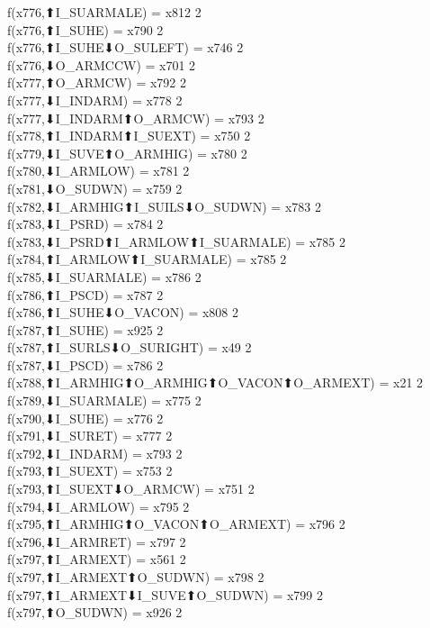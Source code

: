 f(x776,⬆I_SUARMALE) = x812 {2} \\
f(x776,⬆I_SUHE) = x790 {2} \\
f(x776,⬆I_SUHE⬇O_SULEFT) = x746 {2} \\
f(x776,⬇O_ARMCCW) = x701 {2} \\
f(x777,⬆O_ARMCW) = x792 {2} \\
f(x777,⬇I_INDARM) = x778 {2} \\
f(x777,⬇I_INDARM⬆O_ARMCW) = x793 {2} \\
f(x778,⬆I_INDARM⬆I_SUEXT) = x750 {2} \\
f(x779,⬇I_SUVE⬆O_ARMHIG) = x780 {2} \\
f(x780,⬇I_ARMLOW) = x781 {2} \\
f(x781,⬇O_SUDWN) = x759 {2} \\
f(x782,⬇I_ARMHIG⬆I_SUILS⬇O_SUDWN) = x783 {2} \\
f(x783,⬇I_PSRD) = x784 {2} \\
f(x783,⬇I_PSRD⬆I_ARMLOW⬆I_SUARMALE) = x785 {2} \\
f(x784,⬆I_ARMLOW⬆I_SUARMALE) = x785 {2} \\
f(x785,⬇I_SUARMALE) = x786 {2} \\
f(x786,⬆I_PSCD) = x787 {2} \\
f(x786,⬆I_SUHE⬇O_VACON) = x808 {2} \\
f(x787,⬆I_SUHE) = x925 {2} \\
f(x787,⬆I_SURLS⬇O_SURIGHT) = x49 {2} \\
f(x787,⬇I_PSCD) = x786 {2} \\
f(x788,⬆I_ARMHIG⬆O_ARMHIG⬆O_VACON⬆O_ARMEXT) = x21 {2} \\
f(x789,⬇I_SUARMALE) = x775 {2} \\
f(x790,⬇I_SUHE) = x776 {2} \\
f(x791,⬇I_SURET) = x777 {2} \\
f(x792,⬇I_INDARM) = x793 {2} \\
f(x793,⬆I_SUEXT) = x753 {2} \\
f(x793,⬆I_SUEXT⬇O_ARMCW) = x751 {2} \\
f(x794,⬇I_ARMLOW) = x795 {2} \\
f(x795,⬆I_ARMHIG⬆O_VACON⬆O_ARMEXT) = x796 {2} \\
f(x796,⬇I_ARMRET) = x797 {2} \\
f(x797,⬆I_ARMEXT) = x561 {2} \\
f(x797,⬆I_ARMEXT⬆O_SUDWN) = x798 {2} \\
f(x797,⬆I_ARMEXT⬇I_SUVE⬆O_SUDWN) = x799 {2} \\
f(x797,⬆O_SUDWN) = x926 {2} \\
